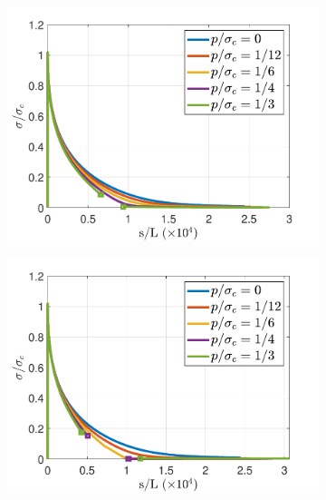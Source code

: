 \begin{figure}[h]
\centering
\begin{subfigure}{.45\textwidth}
  \centering
  \includegraphics[width=\linewidth]{images/traction_separation/1d_nodash_bourdin_I_d.pdf}
  \caption{}
  \label{fig:traction_separation_bourdin_d}
\end{subfigure}%
\begin{subfigure}{.45\textwidth}
  \centering
  \includegraphics[width=\linewidth]{images/traction_separation/1d_nodash_bourdin_I_d2.pdf}
  \caption{}
  \label{fig:traction_separation_bourdin_d2}
\end{subfigure}%


\end{figure}
